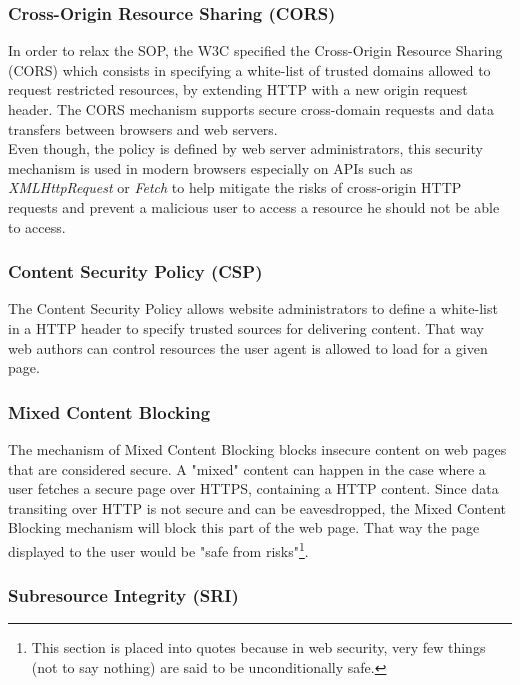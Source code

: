 \documentclass[journal]{IEEEtran}
\begin{document}
\subsubsection{Cross-Origin Resource Sharing (CORS)}
\label{CORSSection}

In order to relax the SOP, the W3C specified the Cross-Origin Resource Sharing (CORS) which consists in specifying a white-list of trusted domains allowed to request restricted resources, by extending HTTP with a new origin request header. The CORS mechanism supports secure cross-domain requests and data transfers between browsers and web servers. \\

Even though, the policy is defined by web server administrators, this security mechanism is used in modern browsers especially on APIs such as \emph{XMLHttpRequest} or \emph{Fetch} to help mitigate the risks of cross-origin HTTP requests and prevent a malicious user to access a resource he should not be able to access.

\subsubsection{Content Security Policy (CSP)}

The Content Security Policy allows website administrators to define a white-list in a HTTP header to specify trusted sources for delivering content. That way web authors can control resources the user agent is allowed to load for a given page.

\subsubsection{Mixed Content Blocking}

The mechanism of Mixed Content Blocking blocks insecure content on web pages that are considered secure. A "mixed" content can happen in the case where a user fetches a secure page over HTTPS, containing a HTTP content. Since data transiting over HTTP is not secure and can be eavesdropped, the Mixed Content Blocking mechanism will block this part of the web page. That way the page displayed to the user would be "safe from risks"\footnote{This section is placed into quotes because in web security, very few things (not to say nothing) are said to be unconditionally safe.}.

\subsubsection{Subresource Integrity (SRI)}
\end{document}
